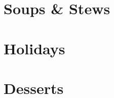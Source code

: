 \documentclass{article}
\begin{document}
\tableofcontents

\section{Soups \& Stews}


\section{Holidays}




\section{Desserts}






\printindex
\end{document}
